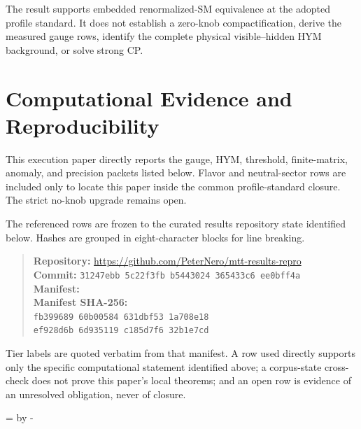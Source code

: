 \documentclass[11pt]{article}
\begin{document}
The result supports embedded renormalized-SM equivalence at the adopted profile
standard. It does not establish a zero-knob compactification, derive the
measured gauge rows, identify the complete physical visible--hidden HYM
background, or solve strong CP.

\section*{Computational Evidence and Reproducibility}
This execution paper directly reports the gauge, HYM, threshold, finite-matrix, anomaly, and precision packets listed below. Flavor and neutral-sector rows are included only to locate this paper inside the common profile-standard closure. The strict no-knob upgrade remains open.

The referenced rows are frozen to the curated results repository state identified below. Hashes are grouped in eight-character blocks for line breaking.
\begin{quote}\small
\textbf{Repository:} \url{https://github.com/PeterNero/mtt-results-repro}\\
\textbf{Commit:} \texttt{31247ebb 5c22f3fb b5443024 365433c6 ee0bff4a}\\
\textbf{Manifest:} \\
\textbf{Manifest SHA-256:}\\
\texttt{fb399689 60b00584 631dbf53 1a708e18}\\
\texttt{ef928d6b 6d935119 c185d7f6 32b1e7cd}
\end{quote}

Tier labels are quoted verbatim from that manifest. A row used directly supports only the specific computational statement identified above; a corpus-state cross-check does not prove this paper's local theorems; and an open row is evidence of an unresolved obligation, never of closure.

\par\begingroup{}=\pagegoal\advance{} by -\pagetotal\ifdim\dimen0<7\baselineskip\newpage\fi\endgroup
\end{document}
